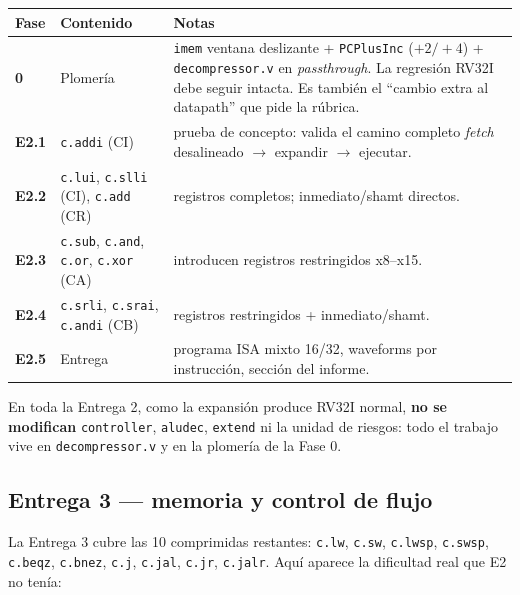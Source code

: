 \documentclass[11pt]{article}
\newcommand{\code}[1]{\texttt{#1}}
\begin{document}
\begin{center}
\small
\begin{tabular}{@{}llp{7.6cm}@{}}
\toprule
Fase & Contenido & Notas \\
\midrule
\textbf{0} & Plomería & \code{imem} ventana deslizante + \code{PCPlusInc} ($+2/+4$) + \code{decompressor.v} en \emph{passthrough}. La regresión RV32I debe seguir intacta. Es también el ``cambio extra al datapath'' que pide la rúbrica. \\
\textbf{E2.1} & \code{c.addi} (CI) & prueba de concepto: valida el camino completo \emph{fetch} desalineado $\to$ expandir $\to$ ejecutar. \\
\textbf{E2.2} & \code{c.lui}, \code{c.slli} (CI), \code{c.add} (CR) & registros completos; inmediato/shamt directos. \\
\textbf{E2.3} & \code{c.sub}, \code{c.and}, \code{c.or}, \code{c.xor} (CA) & introducen registros restringidos x8--x15. \\
\textbf{E2.4} & \code{c.srli}, \code{c.srai}, \code{c.andi} (CB) & registros restringidos + inmediato/shamt. \\
\textbf{E2.5} & Entrega & programa ISA mixto 16/32, waveforms por instrucción, sección del informe. \\
\bottomrule
\end{tabular}
\end{center}

\noindent
En toda la Entrega 2, como la expansión produce RV32I normal, \textbf{no se
modifican} \code{controller}, \code{aludec}, \code{extend} ni la unidad de
riesgos: todo el trabajo vive en \code{decompressor.v} y en la plomería de la
Fase 0.

\subsection{Entrega 3 --- memoria y control de flujo}

La Entrega 3 cubre las 10 comprimidas restantes:
\code{c.lw}, \code{c.sw}, \code{c.lwsp}, \code{c.swsp}, \code{c.beqz},
\code{c.bnez}, \code{c.j}, \code{c.jal}, \code{c.jr}, \code{c.jalr}. Aquí aparece
la dificultad real que E2 no tenía:
\end{document}
